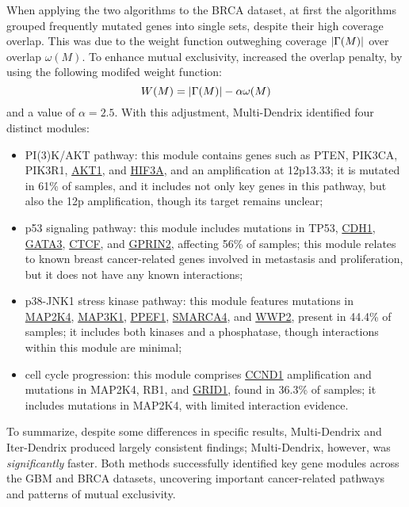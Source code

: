 When applying the two algorithms to the BRCA dataset, at first the algorithms grouped frequently mutated genes into single sets, despite their high coverage overlap. This was due to the weight function outweghing coverage $\left|\Gamma(M)\right|$ over overlap $\omega(M)$. To enhance mutual exclusivity, \textcite{multi-dendrix} increased the overlap penalty, by using the following modifed weight function: $$W(M) = \left|\Gamma(M)\right| - \alpha \omega(M)$$ and a value of $\alpha = 2.5$. With this adjustment, Multi-Dendrix identified four distinct modules:

\begin{itemize}
    \item PI(3)K/AKT pathway: this module contains genes such as PTEN, PIK3CA, PIK3R1, \href{https://en.wikipedia.org/wiki/AKT1}{AKT1}, and \href{https://en.wikipedia.org/wiki/HIF3A}{HIF3A}, and an amplification at 12p13.33; it is mutated in 61\% of samples, and it includes not only key genes in this pathway, but also the 12p amplification, though its target remains unclear;
    \item p53 signaling pathway: this module includes mutations in TP53, \href{https://en.wikipedia.org/wiki/Cadherin-1}{CDH1}, \href{https://en.wikipedia.org/wiki/GATA3}{GATA3}, \href{https://en.wikipedia.org/wiki/CTCF}{CTCF}, and \href{https://en.wikipedia.org/wiki/GPRIN2}{GPRIN2}, affecting 56\% of samples; this module relates to known breast cancer-related genes involved in metastasis and proliferation, but it does not have any known interactions;
    \item p38-JNK1 stress kinase pathway: this module features mutations in \href{https://en.wikipedia.org/wiki/MAP2K4}{MAP2K4}, \href{https://en.wikipedia.org/wiki/MAP3K1}{MAP3K1}, \href{https://en.wikipedia.org/wiki/PPEF1}{PPEF1}, \href{https://en.wikipedia.org/wiki/SMARCA4}{SMARCA4}, and \href{https://en.wikipedia.org/wiki/WWP2}{WWP2}, present in 44.4\% of samples; it includes both kinases and a phosphatase, though interactions within this module are minimal;
    \item cell cycle progression: this module comprises \href{https://en.wikipedia.org/wiki/Cyclin_D1}{CCND1} amplification and mutations in MAP2K4, RB1, and \href{https://en.wikipedia.org/wiki/GRID1}{GRID1}, found in 36.3\% of samples; it includes mutations in MAP2K4, with limited interaction evidence.
\end{itemize}

To summarize, despite some differences in specific results, Multi-Dendrix and Iter-Dendrix produced largely consistent findings; Multi-Dendrix, however, was \textit{significantly} faster. Both methods successfully identified key gene modules across the GBM and BRCA datasets, uncovering important cancer-related pathways and patterns of mutual exclusivity.

